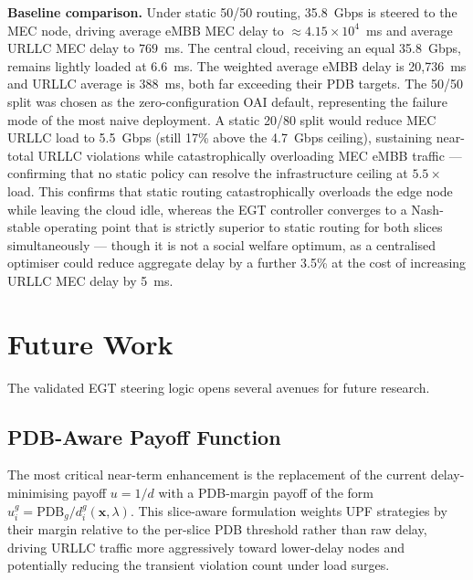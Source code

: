 \documentclass[conference]{IEEEtran}
\begin{document}
\textbf{Baseline comparison.}
Under static 50/50 routing, 35.8~Gbps is steered to the MEC
node, driving average eMBB MEC delay to
$\approx 4.15\times10^4$~ms and average URLLC MEC delay to
$769$~ms. The central cloud, receiving an equal 35.8~Gbps,
remains lightly loaded at 6.6~ms. The weighted average eMBB
delay is 20,736~ms and URLLC average is 388~ms, both far
exceeding their PDB targets. The 50/50 split was chosen as the
zero-configuration OAI default, representing the failure mode
of the most naive deployment. A static 20/80 split would reduce
MEC URLLC load to 5.5~Gbps (still 17\% above the 4.7~Gbps
ceiling), sustaining near-total URLLC violations while
catastrophically overloading MEC eMBB traffic --- confirming
that no static policy can resolve the infrastructure ceiling
at $5.5\times$ load. This confirms that static routing
catastrophically overloads the edge node while leaving the
cloud idle, whereas the EGT controller converges to a
Nash-stable operating point that is strictly superior to static
routing for both slices simultaneously --- though it is not a
social welfare optimum, as a centralised optimiser could reduce
aggregate delay by a further 3.5\% at the cost of increasing
URLLC MEC delay by 5~ms.

\section{Future Work}
\label{sec:future}

The validated EGT steering logic opens several avenues
for future research.

\subsection{PDB-Aware Payoff Function}

The most critical near-term enhancement is the replacement
of the current delay-minimising payoff $u = 1/d$ with a
PDB-margin payoff of the form
$u_i^g = \text{PDB}_g / d_i^g(\mathbf{x},\lambda)$.
This slice-aware formulation weights UPF strategies by their
margin relative to the per-slice PDB threshold rather than raw
delay, driving URLLC traffic more aggressively toward
lower-delay nodes and potentially reducing the transient
violation count under load surges.
\end{document}
